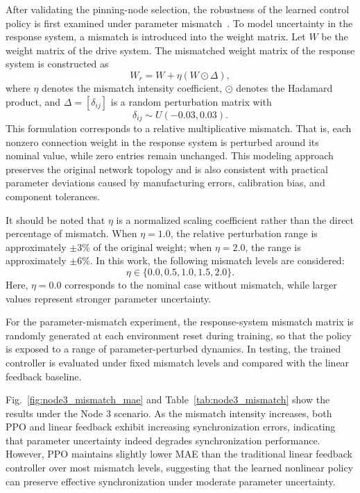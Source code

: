 \documentclass[10pt,twocolumn]{article}
\theoremstyle{definition}
\begin{document}
After validating the pinning-node selection, the robustness of the learned control policy is first examined under parameter mismatch~\cite{zhang2011weak}. To model uncertainty in the response system, a mismatch is introduced into the weight matrix. Let $W$ be the weight matrix of the drive system. The mismatched weight matrix of the response system is constructed as
\begin{equation}
	W_r = W + \eta (W\odot \Delta),
	\label{eq:mismatch_matrix}
\end{equation}
where $\eta$ denotes the mismatch intensity coefficient, $\odot$ denotes the Hadamard product, and $\Delta=[\delta_{ij}]$ is a random perturbation matrix with
\begin{equation}
	\delta_{ij}\sim U(-0.03,0.03).
	\label{eq:mismatch_delta}
\end{equation}
This formulation corresponds to a relative multiplicative mismatch. That is, each nonzero connection weight in the response system is perturbed around its nominal value, while zero entries remain unchanged. This modeling approach preserves the original network topology and is also consistent with practical parameter deviations caused by manufacturing errors, calibration bias, and component tolerances.

It should be noted that $\eta$ is a normalized scaling coefficient rather than the direct percentage of mismatch. When $\eta=1.0$, the relative perturbation range is approximately $\pm 3\%$ of the original weight; when $\eta=2.0$, the range is approximately $\pm 6\%$. In this work, the following mismatch levels are considered:
\begin{equation}
	\eta\in\{0.0,0.5,1.0,1.5,2.0\}.
	\label{eq:mismatch_levels}
\end{equation}
Here, $\eta=0.0$ corresponds to the nominal case without mismatch, while larger values represent stronger parameter uncertainty.

For the parameter-mismatch experiment, the response-system mismatch matrix is randomly generated at each environment reset during training, so that the policy is exposed to a range of parameter-perturbed dynamics. In testing, the trained controller is evaluated under fixed mismatch levels and compared with the linear feedback baseline.

Fig.~\ref{fig:node3_mismatch_mae} and Table~\ref{tab:node3_mismatch} show the results under the Node 3 scenario. As the mismatch intensity increases, both PPO and linear feedback exhibit increasing synchronization errors, indicating that parameter uncertainty indeed degrades synchronization performance. However, PPO maintains slightly lower MAE than the traditional linear feedback controller over most mismatch levels, suggesting that the learned nonlinear policy can preserve effective synchronization under moderate parameter uncertainty.
\end{document}
